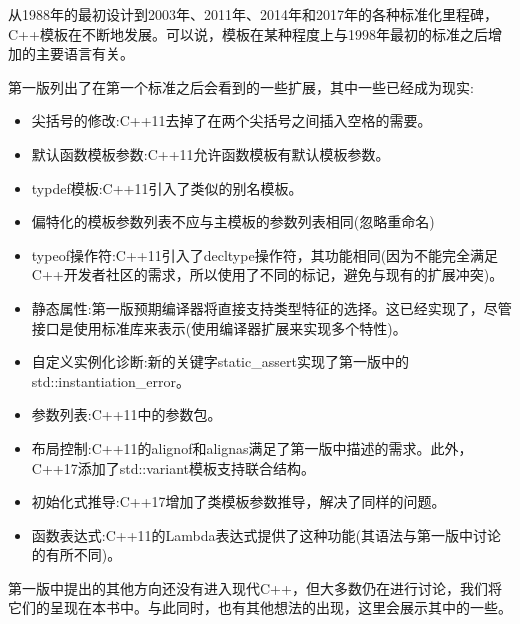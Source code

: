 
从1988年的最初设计到2003年、2011年、2014年和2017年的各种标准化里程碑，C++模板在不断地发展。可以说，模板在某种程度上与1998年最初的标准之后增加的主要语言有关。

第一版列出了在第一个标准之后会看到的一些扩展，其中一些已经成为现实:

\begin{itemize}
\item 
尖括号的修改:C++11去掉了在两个尖括号之间插入空格的需要。

\item 
默认函数模板参数:C++11允许函数模板有默认模板参数。

\item 
typdef模板:C++11引入了类似的别名模板。

\item 
偏特化的模板参数列表不应与主模板的参数列表相同(忽略重命名)

\item 
typeof操作符:C++11引入了decltype操作符，其功能相同(因为不能完全满足C++开发者社区的需求，所以使用了不同的标记，避免与现有的扩展冲突)。

\item 
静态属性:第一版预期编译器将直接支持类型特征的选择。这已经实现了，尽管接口是使用标准库来表示(使用编译器扩展来实现多个特性)。

\item 
自定义实例化诊断:新的关键字static\_assert实现了第一版中的std::instantiation\_error。

\item 
参数列表:C++11中的参数包。

\item 
布局控制:C++11的alignof和alignas满足了第一版中描述的需求。此外，C++17添加了std::variant模板支持联合结构。

\item 
初始化式推导:C++17增加了类模板参数推导，解决了同样的问题。

\item 
函数表达式:C++11的Lambda表达式提供了这种功能(其语法与第一版中讨论的有所不同)。
\end{itemize}

第一版中提出的其他方向还没有进入现代C++，但大多数仍在进行讨论，我们将它们的呈现在本书中。与此同时，也有其他想法的出现，这里会展示其中的一些。



